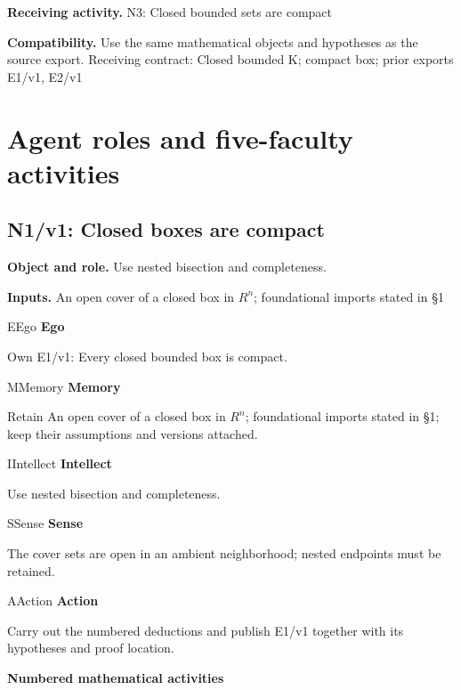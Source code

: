 \documentclass[preprint,12pt,aps,pra,showkeys,amsmath,amssymb,superscriptaddress,floatfix]{revtex4-2}
\theoremstyle{definition}
\theoremstyle{remark}
\newcommand{\mmfaculty}[3]{%
 \begin{mmfacultybox}{#1}{#2}
 {\sffamily\bfseries\color{MMBlue}#2}\par\smallskip #3
 \end{mmfacultybox}}
\newcommand{\field}[2]{\par\smallskip\noindent\textbf{#1.} #2\par}
\begin{document}
\field{Receiving activity}{N3: Closed bounded sets are compact}

\field{Compatibility}{Use the same mathematical objects and hypotheses as the source export.
Receiving contract: Closed bounded K; compact box; prior exports E1/v1,
E2/v1}

\endgroup

\clearpage\section{Agent roles and five-faculty activities}\begingroup\small\linespread{1.05}\selectfont{}

\subsection{N1/v1: Closed boxes are compact}

\field{Object and role}{Use nested bisection and completeness.}

\field{Inputs}{An open cover of a closed box in \(R^{n}\); foundational imports stated
in §1}

\mmfaculty{E}{Ego}{Own E1/v1: Every closed bounded box is compact.}

\mmfaculty{M}{Memory}{Retain An open cover of a closed box in \(R^{n}\); foundational imports
stated in §1; keep their assumptions and versions attached.}

\mmfaculty{I}{Intellect}{Use nested bisection and completeness.}

\mmfaculty{S}{Sense}{The cover sets are open in an ambient neighborhood; nested endpoints
must be retained.}

\mmfaculty{A}{Action}{Carry out the numbered deductions and publish E1/v1 together with its
hypotheses and proof location.}

\smallskip\noindent\textbf{Numbered mathematical activities}
\end{document}
